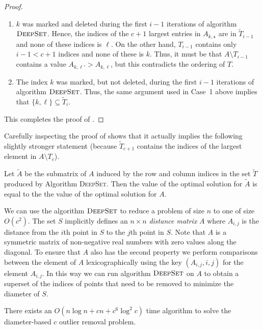 \documentclass{elsart}
\begin{document}
\begin{proof}
\begin{enumerate}
\begin{enumerate}

\item $k$ was marked and deleted during the first $i-1$ iterations of
algorithm $\textsc{DeepSet}$. Hence, the indices of the $c+1$ largest
entries in $A_{k,\star}$ are in $\tilde{T}_{i-1}$ and none of these
indices is $\ell$.  On the other hand, $T_{i-1}$ contains only $i-1 <
c+1$ indices and none of these is $k$.  Thus, it must be that
$A\setminus T_{i-1}$ contains a value 
$A_{k,\ell'}>A_{k,\ell}$, but this contradicts the ordering of $T$.

\item The index $k$ was marked, but not deleted, during the first
$i-1$ iterations of algorithm $\textsc{DeepSet}$.  Thus, the same
argument used in Case~1 above implies that $\{k,\ell\}\subseteq
\tilde{T}_i$.

\end{enumerate}
\end{enumerate}
This completes the proof of .
\end{proof} 

Carefully inspecting the proof of  shows that it
actually implies the following slightly stronger statement (because
$\tilde{T}_{c+1}$ contains the indices of the largest element in
$A\setminus T_c$).

\begin{lem}
Let $\tilde{A}$ be the submatrix of $A$ induced by the row and column
indices in the set $\tilde{T}$ produced by Algorithm \textsc{DeepSet}.
Then the value of the optimal solution for $\tilde{A}$ is equal to the
the value of the optimal solution for $A$.
\end{lem}

We can use the algorithm $\textsc{DeepSet}$ to reduce a problem of
size $n$ to one of size $O(c^2)$.  The set $S$ implicitly defines an
$n\times n$ \emph{distance matrix} $A$ where $A_{i,j}$ is the distance
from the $i$th point in $S$ to the $j$th point in $S$.  Note that $A$
is a symmetric matrix of non-negative real numbers with zero values
along the diagonal.  To ensure that $A$ also has the second property
we perform comparisons between the element of $A$ lexicographically
using the key $(A_{i,j}, i, j)$ for the element $A_{i,j}$.  In this
way we can run algorithm $\textsc{DeepSet}$ on $A$ to obtain a
superset of the indices of points that need to be removed to minimize
the diameter of $S$.

\begin{lem}
There exists an $O(n\log n + cn + c^6\log^2 c)$ time algorithm to
solve the diameter-based $c$ outlier removal problem.
\end{lem}
\end{document}
